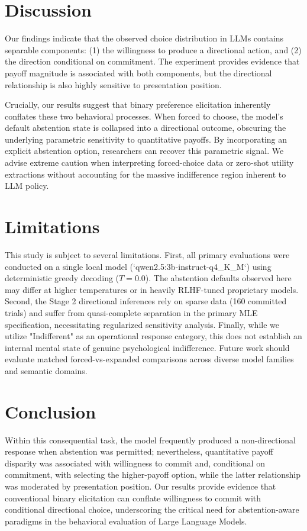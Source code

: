 \section{Discussion}
\label{sec:discussion}
Our findings indicate that the observed choice distribution in LLMs contains separable components: (1) the willingness to produce a directional action, and (2) the direction conditional on commitment. The experiment provides evidence that payoff magnitude is associated with both components, but the directional relationship is also highly sensitive to presentation position.

Crucially, our results suggest that binary preference elicitation inherently conflates these two behavioral processes. When forced to choose, the model's default abstention state is collapsed into a directional outcome, obscuring the underlying parametric sensitivity to quantitative payoffs. By incorporating an explicit abstention option, researchers can recover this parametric signal. We advise extreme caution when interpreting forced-choice data or zero-shot utility extractions without accounting for the massive indifference region inherent to LLM policy.

\section{Limitations}
\label{sec:limitations}
This study is subject to several limitations. First, all primary evaluations were conducted on a single local model (`qwen2.5:3b-instruct-q4_K_M`) using deterministic greedy decoding ($T=0.0$). The abstention defaults observed here may differ at higher temperatures or in heavily RLHF-tuned proprietary models. Second, the Stage 2 directional inferences rely on sparse data (160 committed trials) and suffer from quasi-complete separation in the primary MLE specification, necessitating regularized sensitivity analysis. Finally, while we utilize "Indifferent" as an operational response category, this does not establish an internal mental state of genuine psychological indifference. Future work should evaluate matched forced-vs-expanded comparisons across diverse model families and semantic domains.

\section{Conclusion}
\label{sec:conclusion}
Within this consequential task, the model frequently produced a non-directional response when abstention was permitted; nevertheless, quantitative payoff disparity was associated with willingness to commit and, conditional on commitment, with selecting the higher-payoff option, while the latter relationship was moderated by presentation position. Our results provide evidence that conventional binary elicitation can conflate willingness to commit with conditional directional choice, underscoring the critical need for abstention-aware paradigms in the behavioral evaluation of Large Language Models.

